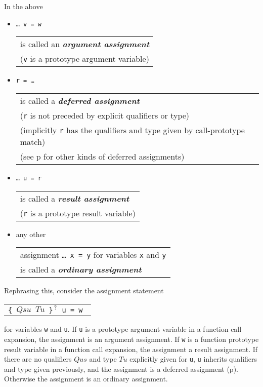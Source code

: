 \documentclass[12pt]{article}
\newcommand{\key}[1]{{\bf \em #1}\index{#1}}
\newcommand{\pagref}[1]{p\pageref{#1}}
\newcommand{\QMARK}{{$^{\,\mbox{\footnotesize ?}}$}}
\newenvironment{indpar}[1][0.3in]%
	{\begin{list}{}%
		     {\setlength{\itemsep}{0in}%
		      \setlength{\topsep}{0in}%
		      \setlength{\parsep}{1ex}%
		      \setlength{\labelwidth}{#1}%
		      \setlength{\leftmargin}{#1}%
		      \addtolength{\leftmargin}{\labelsep}}%
	 \item}%
	{\end{list}}
\begin{document}
In the above
\begin{indpar}
\begin{itemize}
\item {\tt \ldots{}~v = w}
	\begin{tabular}[t]{@{}l}
	is called an \key{argument assignment} \\
        ({\tt v} is a prototype argument variable)
	\end{tabular}
\item {\tt r = \ldots}
	\begin{tabular}[t]{@{}l}
	is called a \key{deferred assignment} \\
	({\tt r} is not preceded by explicit qualifiers or type) \\
	(implicitly {\tt r} has the qualifiers and type given by
	call-prototype match) \\
        (see \pagref{DEFERRED-ASSIGNMENT} for other kinds of
	deferred assignments) \\
	\end{tabular}
\item {\tt \ldots{}~u = r}
	\begin{tabular}[t]{@{}l}
	is called a \key{result assignment} \\
	({\tt r} is a prototype result variable)
	\end{tabular}
\item any other
	\begin{tabular}[t]{@{}l}
	assignment {\tt \ldots~x = y} for variables {\tt x} and {\tt y} \\
	is called a \key{ordinary assignment}
	\end{tabular}
\end{itemize}
\end{indpar}

Rephrasing this, consider the assignment statement
\begin{center}
\begin{tabular}{l}
\tt \{ $Qsu$ $Tu$ \}\QMARK{} u = w \\
\end{tabular}
\end{center}

for variables {\tt w} and {\tt u}.
If {\tt u} is a prototype argument variable in a function call expansion,
the assignment is an argument assignment.
If {\tt w} is a function prototype result variable in a function call expansion,
the assignment a result assignment.
If there are no qualifiers $Qus$ and type $Tu$ explicitly given for {\tt u},
{\tt u} inherits qualifiers and type given previously, and the assignment
is a deferred assignment (\pagref{DEFERRED-ASSIGNMENT}).
Otherwise the assignment is an ordinary assignment.
\end{document}
